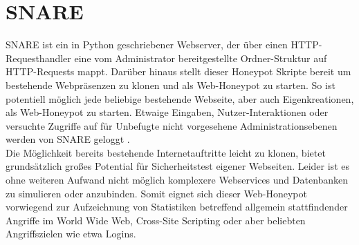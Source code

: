 \section{SNARE}
\label{sec:SNARE}

SNARE ist ein in Python geschriebener Webserver, der über einen HTTP-Requesthandler eine vom Administrator bereitgestellte Ordner-Struktur auf HTTP-Requests mappt. Darüber hinaus stellt dieser Honeypot Skripte bereit um bestehende Webpräsenzen zu klonen und als Web-Honeypot zu starten. So ist potentiell möglich jede beliebige bestehende Webseite, aber auch Eigenkreationen, als Web-Honeypot zu starten. Etwaige Eingaben, Nutzer-Interaktionen oder versuchte Zugriffe auf für Unbefugte nicht vorgesehene Administrationsebenen werden von SNARE geloggt \cite{Snare16}.\\

Die Möglichkeit bereits bestehende Internetauftritte leicht zu klonen, bietet grundsätzlich großes Potential für Sicherheitstest eigener Webseiten. Leider ist es ohne weiteren Aufwand nicht möglich komplexere Webservices und Datenbanken zu simulieren oder anzubinden. Somit eignet sich dieser Web-Honeypot vorwiegend zur Aufzeichnung von Statistiken betreffend allgemein stattfindender Angriffe im World Wide Web, Cross-Site Scripting oder aber beliebten Angriffszielen wie etwa Logins.